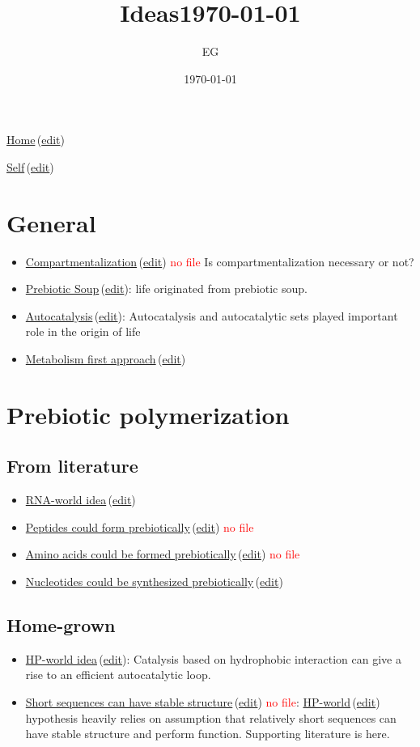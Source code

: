 \documentclass[12pt]{paper}
\title{Ideas\today}
\author{EG}
\date{\today}
\newcommand{\red}[1]{\textcolor{red}{#1}}
\newcommand{\wikilink}[2] { \href{#1.pdf}{#2}\,(\href{#1.tex}{edit})}
\begin{document}
 \maketitle
\wikilink{home}{Home}

\wikilink{ideas}{Self}
 
\tableofcontents


\section{General}
\begin{itemize}
 \item \wikilink{compartment}{Compartmentalization} \red{no file} Is compartmentalization 
necessary or not?
\item \wikilink{prebiotic\_soup}{Prebiotic Soup}: life originated from prebiotic soup.
\item \wikilink{autocatalysis}{Autocatalysis}: Autocatalysis and autocatalytic sets played 
important role in the origin of life
\item \wikilink{metabolism}{Metabolism first approach}
\end{itemize}


\section{Prebiotic polymerization}
\subsection{From literature}
\begin{itemize}
\item \wikilink{rna\_world}{RNA-world idea}
 \item  \wikilink{peptide\_world}{Peptides could form prebiotically} \red{no file}
 \item \wikilink{prebiotic\_aa}{Amino acids could be formed prebiotically} \red{no file}
 \item \wikilink{prebiotic\_nucleotides}{Nucleotides could be synthesized prebiotically}
\end{itemize}

\subsection{Home-grown}
\begin{itemize}
 \item \wikilink{hp\_world\_thesis}{HP-world idea}: Catalysis based on hydrophobic interaction can 
give a rise to an efficient 
autocatalytic loop.
\item \wikilink{short\_able\_sequences}{Short sequences can have stable structure} \red{no file}: 
\wikilink{hp\_world\_thesis}{HP-world}  hypothesis heavily relies on 
assumption that relatively short sequences can have stable structure and perform function. 
Supporting literature is here. 

\end{itemize}
\end{document}

